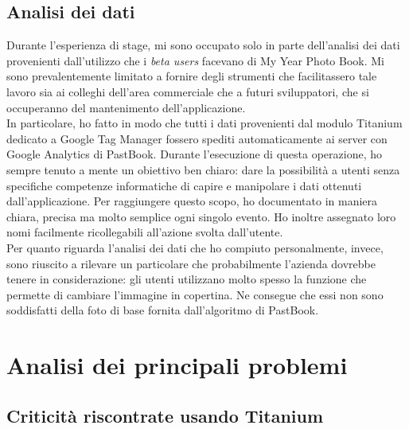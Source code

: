 		\subsection{Analisi dei dati}
			Durante l'esperienza di stage, mi sono occupato solo in parte dell'analisi dei dati provenienti dall'utilizzo che i
			\emph{beta users} facevano di My Year Photo Book. Mi sono prevalentemente limitato a fornire degli strumenti che
			facilitassero tale lavoro sia ai colleghi dell'area commerciale che a futuri sviluppatori, che si occuperanno del mantenimento
			dell'applicazione.\\
			In particolare, ho fatto in modo che tutti i dati provenienti dal modulo Titanium dedicato a Google Tag Manager fossero
			spediti automaticamente ai server con Google Analytics di PastBook. Durante l'esecuzione di questa operazione, ho sempre
			tenuto a mente un obiettivo ben chiaro: dare la possibilità a utenti senza specifiche competenze informatiche di capire e
			manipolare i dati ottenuti dall'applicazione. Per raggiungere questo scopo, ho documentato in maniera chiara, precisa ma molto
			semplice ogni singolo evento. Ho inoltre assegnato loro nomi facilmente ricollegabili all'azione svolta dall'utente.\\
			Per quanto riguarda l'analisi dei dati che ho compiuto personalmente, invece, sono riuscito a rilevare un particolare
			che probabilmente l'azienda dovrebbe tenere in considerazione: gli utenti utilizzano molto spesso la funzione che permette
			di cambiare l'immagine in copertina. Ne consegue che essi non sono soddisfatti della foto di base fornita dall'algoritmo
			di PastBook.
	\section{Analisi dei principali problemi}
		\subsection{Criticità riscontrate usando Titanium}
